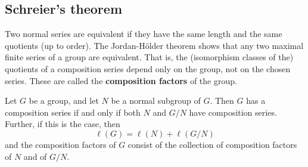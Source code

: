 \subsection{Schreier's theorem}
Two normal series are equivalent if they have the same length and the same quotients (up to order). The Jordan-H\"older theorem shows that any two maximal finite series of a group are equivalent. That is, the (isomorphism classes of the) quotients of a composition series depend only on the group, not on the chosen series. These are called the \textbf{composition factors} of the group.
\begin{theorem}\label{group comp factor quotient}
Let $G$ be a group, and let $N$ be a normal subgroup of $G$. Then $G$ has a composition series if and only if both $N$ and $G/N$ have composition series. Further, if this is the case, then
\[\ell(G)=\ell(N)+\ell(G/N)\]
and the composition factors of $G$ consist of the collection of composition factors of $N$ and of $G/N$.
\end{theorem}
